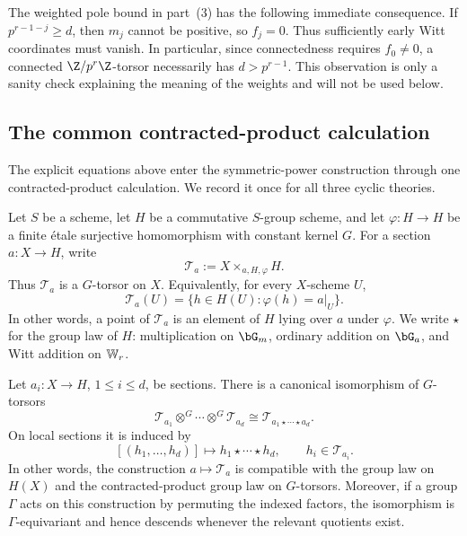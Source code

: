 \begin{rem*}\label{rem:realization_Wr_sanity}
The weighted pole bound in part~(3) has the following immediate consequence.
If $p^{r-1-j}\geq d$, then $m_j$ cannot be positive, so $f_j=0$. Thus
sufficiently early Witt coordinates must vanish. In particular, since
connectedness requires $f_0\neq0$, a connected $\Z/p^r\Z$-torsor necessarily
has $d>p^{r-1}$. This observation is only a sanity check explaining the
meaning of the weights and will not be used below.
\end{rem*}

\subsection*{The common contracted-product calculation}

The explicit equations above enter the symmetric-power construction through
one contracted-product calculation. We record it once for all three cyclic
theories.

Let $S$ be a scheme, let $H$ be a commutative $S$-group scheme, and let
$\varphi:H\to H$ be a finite \'etale surjective homomorphism with constant
kernel $G$. For a section $a:X\to H$, write
\[
    \mathcal T_a:=X\times_{a,H,\varphi}H.
\]
Thus $\mathcal T_a$ is a $G$-torsor on $X$. Equivalently, for every
$X$-scheme $U$,
\[
    \mathcal T_a(U)=
    \{h\in H(U):\varphi(h)=a|_U\}.
\]
In other words, a point of $\mathcal T_a$ is an element of $H$ lying over
$a$ under $\varphi$. We write $\star$ for the group law of $H$:
multiplication on $\bG_m$, ordinary addition on $\bG_a$, and Witt addition
on $\mathbb{W}_r$.

\begin{prop}
\label{prop:parallel_cyclic_product_torsor}
Let $a_i:X\to H$, $1\leq i\leq d$, be sections. There is a canonical
isomorphism of $G$-torsors
\[
    \mathcal T_{a_1}\otimes^G\cdots\otimes^G\mathcal T_{a_d}
       \cong \mathcal T_{a_1\star\cdots\star a_d}.
\]
On local sections it is induced by
\[
    [(h_1,\dots,h_d)]\longmapsto
    h_1\star\cdots\star h_d,
    \qquad h_i\in\mathcal T_{a_i}.
\]
In other words, the construction $a\mapsto\mathcal T_a$ is compatible with
the group law on $H(X)$ and the contracted-product group law on $G$-torsors.
Moreover, if a group $\Gamma$ acts on this construction by permuting the
indexed factors, the isomorphism is $\Gamma$-equivariant and hence descends
whenever the relevant quotients exist.
\end{prop}

